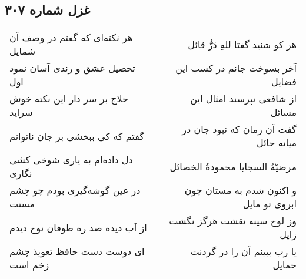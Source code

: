 \begin{center}
\section*{غزل شماره ۳۰۷}
\label{sec:sh307}
\begin{longtable}{l p{0.5cm} r}
هر نکته‌ای که گفتم در وصف آن شمایل
&&
هر کو شنید گفتا للهِ دَرُّ قائل
\\
تحصیل عشق و رندی آسان نمود اول
&&
آخر بسوخت جانم در کسب این فضایل
\\
حلاج بر سر دار این نکته خوش سراید
&&
از شافعی نپرسند امثال این مسائل
\\
گفتم که کی ببخشی بر جان ناتوانم
&&
گفت آن زمان که نبود جان در میانه حائل
\\
دل داده‌ام به یاری شوخی کشی نگاری
&&
مرضیّةُ السجایا محمودةُ الخصائل
\\
در عین گوشه‌گیری بودم چو چشم مستت
&&
و اکنون شدم به مستان چون ابروی تو مایل
\\
از آب دیده صد ره طوفان نوح دیدم
&&
وز لوح سینه نقشت هرگز نگشت زایل
\\
ای دوست دست حافظ تعویذ چشم زخم است
&&
یا رب ببینم آن را در گردنت حمایل
\\
\end{longtable}
\end{center}
